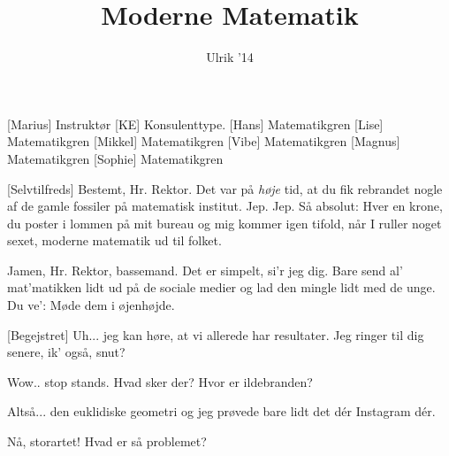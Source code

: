 \documentclass[a4paper,11pt]{article}
\title{Moderne Matematik}
\author{Ulrik '14}
\begin{document}
\maketitle

\begin{roles}
[Marius] Instruktør
[KE] Konsulenttype.
[Hans] Matematikgren
[Lise] Matematikgren
[Mikkel] Matematikgren
[Vibe] Matematikgren
[Magnus] Matematikgren
[Sophie] Matematikgren
\end{roles}

\begin{props}
\end{props}


\begin{sketch}


[Selvtilfreds] Bestemt, Hr. Rektor. Det var på \emph{høje} tid, at du fik rebrandet nogle af de gamle fossiler på matematisk institut. Jep. Jep. Så absolut: Hver en krone, du poster i lommen på mit bureau og mig kommer igen tifold, når I ruller noget sexet, moderne matematik ud til folket.


 Jamen, Hr. Rektor, bassemand. Det er simpelt, si'r jeg dig. Bare send al' mat'matikken lidt ud på de sociale medier og lad den mingle lidt med de unge. Du ve': Møde dem i øjenhøjde.


[Begejstret] Uh... jeg kan høre, at vi allerede har resultater. Jeg ringer til dig senere, ik' også, snut?


 Wow.. stop stands. Hvad sker der? Hvor er ildebranden?

 Altså... den euklidiske geometri og jeg prøvede bare lidt det dér Instagram dér.


 Nå, storartet! Hvad er så problemet?


\end{sketch}
\end{document}
